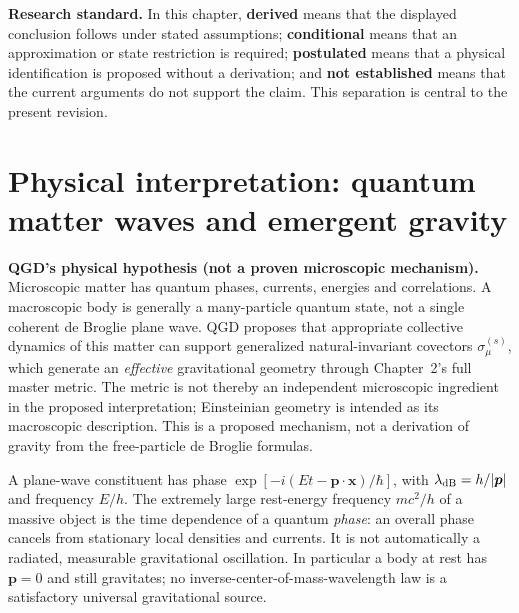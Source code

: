 \documentclass[11pt,a4paper]{article}
\begin{document}
\noindent\textbf{Research standard.} In this chapter, \textbf{derived} means that the displayed conclusion follows under stated assumptions; \textbf{conditional} means that an approximation or state restriction is required; \textbf{postulated} means that a physical identification is proposed without a derivation; and \textbf{not established} means that the current arguments do not support the claim. This separation is central to the present revision.


\section{Physical interpretation: quantum matter waves and emergent gravity}\label{sec:qgd-physical-heart}
\noindent\textbf{QGD's physical hypothesis (not a proven microscopic mechanism).}
Microscopic matter has quantum phases, currents, energies and correlations.  A macroscopic body is generally a many-particle quantum state, not a single coherent de Broglie plane wave.  QGD proposes that appropriate collective dynamics of this matter can support generalized natural-invariant covectors $\sigma_\mu^{(s)}$, which generate an \emph{effective} gravitational geometry through Chapter~2's full master metric.  The metric is not thereby an independent microscopic ingredient in the proposed interpretation; Einsteinian geometry is intended as its macroscopic description.  This is a proposed mechanism, not a derivation of gravity from the free-particle de Broglie formulas.

A plane-wave constituent has phase $\exp[-i(Et-\bm p\cdot\bm x)/\hbar]$, with $\lambda_{\rm dB}=h/|\bm p|$ and frequency $E/h$. The extremely large rest-energy frequency $mc^2/h$ of a massive object is the time dependence of a quantum \emph{phase}: an overall phase cancels from stationary local densities and currents.  It is not automatically a radiated, measurable gravitational oscillation. In particular a body at rest has $\bm p=0$ and still gravitates; no inverse-center-of-mass-wavelength law is a satisfactory universal gravitational source.
\end{document}
